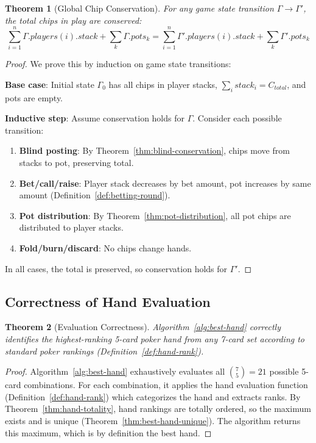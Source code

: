 \documentclass[11pt,a4paper]{article}
\newtheorem{theorem}{Theorem}[section]
\begin{document}
\begin{theorem}[Global Chip Conservation]
\label{thm:global-conservation}
For any game state transition $\Gamma \to \Gamma'$, the total chips in play are conserved:
\[
\sum_{i=1}^{n} \Gamma.players(i).stack + \sum_{k} \Gamma.pots_k = \sum_{i=1}^{n} \Gamma'.players(i).stack + \sum_{k} \Gamma'.pots_k
\]
\end{theorem}

\begin{proof}
We prove this by induction on game state transitions:

\textbf{Base case}: Initial state $\Gamma_0$ has all chips in player stacks, $\sum_i stack_i = C_{total}$, and pots are empty.

\textbf{Inductive step}: Assume conservation holds for $\Gamma$. Consider each possible transition:
\begin{enumerate}
    \item \textbf{Blind posting}: By Theorem~\ref{thm:blind-conservation}, chips move from stacks to pot, preserving total.
    \item \textbf{Bet/call/raise}: Player stack decreases by bet amount, pot increases by same amount (Definition~\ref{def:betting-round}).
    \item \textbf{Pot distribution}: By Theorem~\ref{thm:pot-distribution}, all pot chips are distributed to player stacks.
    \item \textbf{Fold/burn/discard}: No chips change hands.
\end{enumerate}
In all cases, the total is preserved, so conservation holds for $\Gamma'$.
\end{proof}

\subsection{Correctness of Hand Evaluation}

\begin{theorem}[Evaluation Correctness]
\label{thm:eval-correctness}
Algorithm~\ref{alg:best-hand} correctly identifies the highest-ranking 5-card poker hand from any 7-card set according to standard poker rankings (Definition~\ref{def:hand-rank}).
\end{theorem}

\begin{proof}
Algorithm~\ref{alg:best-hand} exhaustively evaluates all $\binom{7}{5} = 21$ possible 5-card combinations. For each combination, it applies the hand evaluation function (Definition~\ref{def:hand-rank}) which categorizes the hand and extracts ranks. By Theorem~\ref{thm:hand-totality}, hand rankings are totally ordered, so the maximum exists and is unique (Theorem~\ref{thm:best-hand-unique}). The algorithm returns this maximum, which is by definition the best hand.
\end{proof}
\end{document}
